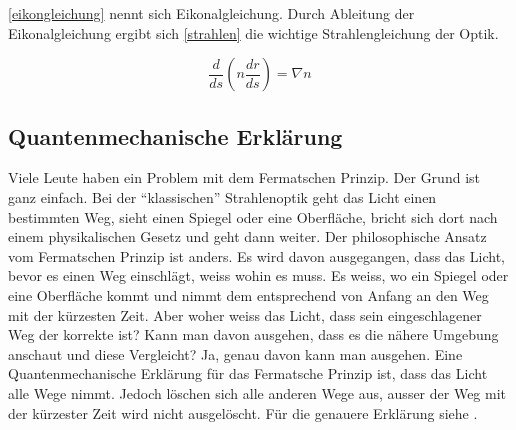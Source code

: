 \eqref{eikongleichung} nennt sich Eikonalgleichung.
Durch Ableitung der Eikonalgleichung ergibt sich \eqref{strahlen} die wichtige Strahlengleichung der Optik.

\begin{equation}
	\frac{d}{ds} \left ( n \frac{dr}{ds} \right ) = \nabla n
	\label{strahlen}
\end{equation}

\subsection{Quantenmechanische Erklärung}
Viele Leute haben ein Problem mit dem Fermatschen Prinzip. 
Der Grund ist ganz einfach. 
Bei der ``klassischen'' Strahlenoptik geht das Licht einen bestimmten Weg, 
sieht einen Spiegel oder eine Oberfläche, bricht sich dort nach einem 
physikalischen Gesetz und geht dann weiter.
Der philosophische Ansatz vom Fermatschen Prinzip ist anders. 
Es wird davon ausgegangen, dass das Licht, bevor es einen Weg einschlägt, 
weiss wohin es muss. Es weiss, wo ein Spiegel oder eine Oberfläche kommt und 
nimmt dem entsprechend von Anfang an den Weg mit der kürzesten Zeit.
Aber woher weiss das Licht, dass sein eingeschlagener Weg der korrekte ist?
Kann man davon ausgehen, dass es die nähere Umgebung anschaut und diese Vergleicht?
Ja, genau davon kann man ausgehen. Eine Quantenmechanische Erklärung für das Fermatsche Prinzip ist, 
dass das Licht alle Wege nimmt. Jedoch löschen sich alle anderen Wege aus, 
ausser der Weg mit der kürzester Zeit wird nicht ausgelöscht.
Für die genauere Erklärung siehe \cite{quanten}.
